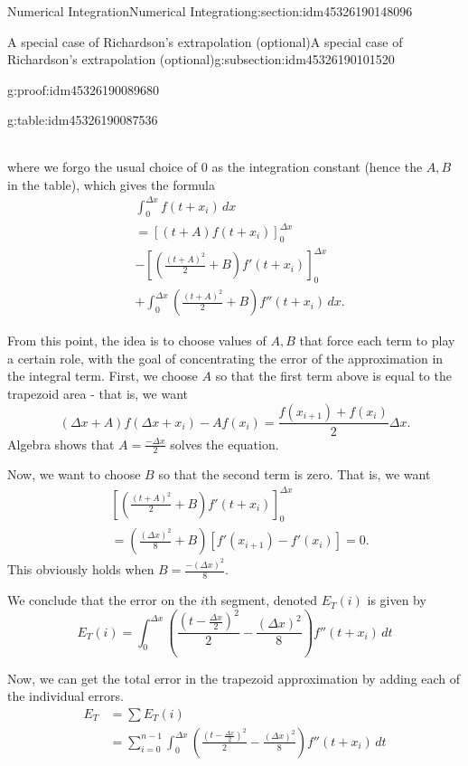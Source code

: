 \documentclass[oneside,10pt,]{article}
\numberwithin{equation}{section}
\numberwithin{equation}{section}
\newcommand{\amp}{&}
\begin{document}
\begin{sectionptx}{Numerical Integration}{}{Numerical Integration}{}{}{g:section:idm45326190148096}
\begin{subsectionptx}{A special case of Richardson's extrapolation (optional)}{}{A special case of Richardson's extrapolation (optional)}{}{}{g:subsection:idm45326190101520}
\begin{proofptx}{}{g:proof:idm45326190089680}
\begin{tableptx}{\textbf{}}{g:table:idm45326190087536}{}
\begin{tabular}{ll}
\end{tabular}
\end{tableptx}%
 where we forgo the usual choice of 0 as the integration constant (hence the \(A, B\) in the table), which gives the formula%
\begin{align*}
\amp\int_0^{\Delta x} f(t + x_i)\, dx \\
\amp = \left[(t+A)f(t+x_i)\right]_0^{\Delta x} \\
\amp - \left[\left(\frac{(t + A)^2}{2} + B\right)f'(t + x_i)\right]_0^{\Delta x}\\
\amp+ \int_0^{\Delta x} \left(\frac{(t + A)^2}{2} + B\right) f''(t + x_i)\, dx.
\end{align*}
%
\par
From this point, the idea is to choose values of \(A, B\) that force each term to play a certain role, with the goal of concentrating the error of the approximation in the integral term. First, we choose \(A\) so that the first term above is equal to the trapezoid area - that is, we want%
\begin{equation*}
(\Delta x + A) f(\Delta x + x_i) - Af(x_i) = \frac{f(x_{i+1}) + f(x_i)}{2} \Delta x.
\end{equation*}
Algebra shows that \(A = \frac{-\Delta x}{2}\) solves the equation.%
\par
Now, we want to choose \(B\) so that the second term is zero. That is, we want%
\begin{align*}
\amp \left[\left(\frac{(t + A)^2}{2} + B\right)f'(t + x_i)\right]_0^{\Delta x} \\
\amp = \left(\frac{(\Delta x)^2}{8} + B\right)\left[f'(x_{i+1}) - f'(x_i)\right]= 0.
\end{align*}
This obviously holds when \(B = \frac{-(\Delta x)^2}{8}\).%
\par
We conclude that the error on the \(i\)th segment, denoted \(E_T(i)\) is given by%
\begin{equation*}
E_T(i) = \int_0^{\Delta x} \left(\frac{(t - \frac{\Delta x}{2})^2}{2} - \frac{(\Delta x)^2}{8}\right) f''(t + x_i) \, dt
\end{equation*}
%
\par
Now, we can get the total error in the trapezoid approximation by adding each of the individual errors.%
\begin{align*}
E_T \amp= \sum E_T(i)\\
\amp = \sum_{i=0}^{n-1} \int_0^{\Delta x} \left(\frac{(t - \frac{\Delta x}{2})^2}{2} - \frac{(\Delta x)^2}{8}\right) f''(t + x_i) \, dt \\

\end{align*}
\end{proofptx}
\end{subsectionptx}
\end{sectionptx}
\end{document}
